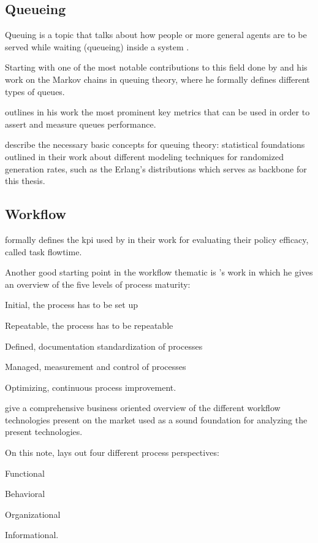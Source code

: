 \documentclass[draft=false]{seal_thesis}
\begin{document}
\subsection{Queueing}

Queuing is a topic that talks about how people or more general agents are to be served while waiting (\ie queueing) inside a system \citep{Kendall1953}.

Starting with one of the most notable contributions to this field done by \citet{Kendall1953} and his work on the Markov chains in queuing theory, where he formally defines different types of queues.

\citet{Pinedo2008} outlines in his work the most prominent key metrics that can be used in order to assert and measure queues performance.

\citet{Adan2016} describe the necessary basic concepts for queuing theory: statistical foundations outlined in their work about different modeling techniques for randomized generation rates, such as the Erlang's distributions which serves as backbone for this thesis.

\subsection{Workflow}
\label{subsec:workflow}

\citet{Baker1974} formally defines the \gls{kpi} used by \citet{Zeng2005} in their work for evaluating their policy efficacy, called task flowtime.

Another good starting point in the workflow thematic is \citet{Macintosh1993}'s work in which he gives an overview of the five levels of process maturity:
\begin{enumerate*}
	\item Initial, the process has to be set up
	\item Repeatable, the process has to be repeatable
	\item Defined, documentation standardization of processes
	\item Managed, measurement and control of processes
	\item Optimizing, continuous process improvement.
\end{enumerate*}

\citet{Georgakopoulos1995} give a comprehensive business oriented overview of the different workflow technologies present on the market used as a sound foundation for analyzing the present technologies.

On this note, \citet{Giaglis2001} lays out four different process perspectives:
\begin{enumerate*}
	\item Functional
	\item Behavioral
	\item Organizational
	\item Informational.
\end{enumerate*}
\end{document}
